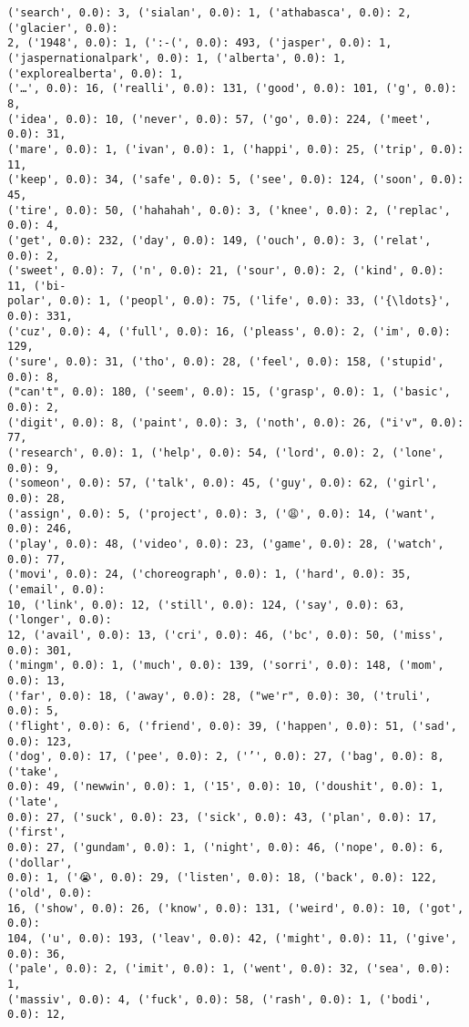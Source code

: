 \documentclass[11pt]{article}
\begin{document}
\begin{Verbatim}[commandchars=\\\{\}]
('search', 0.0): 3, ('sialan', 0.0): 1, ('athabasca', 0.0): 2, ('glacier', 0.0):
2, ('1948', 0.0): 1, (':-(', 0.0): 493, ('jasper', 0.0): 1,
('jaspernationalpark', 0.0): 1, ('alberta', 0.0): 1, ('explorealberta', 0.0): 1,
('…', 0.0): 16, ('realli', 0.0): 131, ('good', 0.0): 101, ('g', 0.0): 8,
('idea', 0.0): 10, ('never', 0.0): 57, ('go', 0.0): 224, ('meet', 0.0): 31,
('mare', 0.0): 1, ('ivan', 0.0): 1, ('happi', 0.0): 25, ('trip', 0.0): 11,
('keep', 0.0): 34, ('safe', 0.0): 5, ('see', 0.0): 124, ('soon', 0.0): 45,
('tire', 0.0): 50, ('hahahah', 0.0): 3, ('knee', 0.0): 2, ('replac', 0.0): 4,
('get', 0.0): 232, ('day', 0.0): 149, ('ouch', 0.0): 3, ('relat', 0.0): 2,
('sweet', 0.0): 7, ('n', 0.0): 21, ('sour', 0.0): 2, ('kind', 0.0): 11, ('bi-
polar', 0.0): 1, ('peopl', 0.0): 75, ('life', 0.0): 33, ('{\ldots}', 0.0): 331,
('cuz', 0.0): 4, ('full', 0.0): 16, ('pleass', 0.0): 2, ('im', 0.0): 129,
('sure', 0.0): 31, ('tho', 0.0): 28, ('feel', 0.0): 158, ('stupid', 0.0): 8,
("can't", 0.0): 180, ('seem', 0.0): 15, ('grasp', 0.0): 1, ('basic', 0.0): 2,
('digit', 0.0): 8, ('paint', 0.0): 3, ('noth', 0.0): 26, ("i'v", 0.0): 77,
('research', 0.0): 1, ('help', 0.0): 54, ('lord', 0.0): 2, ('lone', 0.0): 9,
('someon', 0.0): 57, ('talk', 0.0): 45, ('guy', 0.0): 62, ('girl', 0.0): 28,
('assign', 0.0): 5, ('project', 0.0): 3, ('😩', 0.0): 14, ('want', 0.0): 246,
('play', 0.0): 48, ('video', 0.0): 23, ('game', 0.0): 28, ('watch', 0.0): 77,
('movi', 0.0): 24, ('choreograph', 0.0): 1, ('hard', 0.0): 35, ('email', 0.0):
10, ('link', 0.0): 12, ('still', 0.0): 124, ('say', 0.0): 63, ('longer', 0.0):
12, ('avail', 0.0): 13, ('cri', 0.0): 46, ('bc', 0.0): 50, ('miss', 0.0): 301,
('mingm', 0.0): 1, ('much', 0.0): 139, ('sorri', 0.0): 148, ('mom', 0.0): 13,
('far', 0.0): 18, ('away', 0.0): 28, ("we'r", 0.0): 30, ('truli', 0.0): 5,
('flight', 0.0): 6, ('friend', 0.0): 39, ('happen', 0.0): 51, ('sad', 0.0): 123,
('dog', 0.0): 17, ('pee', 0.0): 2, ('’', 0.0): 27, ('bag', 0.0): 8, ('take',
0.0): 49, ('newwin', 0.0): 1, ('15', 0.0): 10, ('doushit', 0.0): 1, ('late',
0.0): 27, ('suck', 0.0): 23, ('sick', 0.0): 43, ('plan', 0.0): 17, ('first',
0.0): 27, ('gundam', 0.0): 1, ('night', 0.0): 46, ('nope', 0.0): 6, ('dollar',
0.0): 1, ('😭', 0.0): 29, ('listen', 0.0): 18, ('back', 0.0): 122, ('old', 0.0):
16, ('show', 0.0): 26, ('know', 0.0): 131, ('weird', 0.0): 10, ('got', 0.0):
104, ('u', 0.0): 193, ('leav', 0.0): 42, ('might', 0.0): 11, ('give', 0.0): 36,
('pale', 0.0): 2, ('imit', 0.0): 1, ('went', 0.0): 32, ('sea', 0.0): 1,
('massiv', 0.0): 4, ('fuck', 0.0): 58, ('rash', 0.0): 1, ('bodi', 0.0): 12,

\end{Verbatim}
\end{document}
